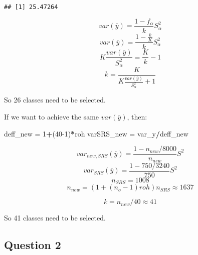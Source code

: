 \documentclass[]{article}
\newenvironment{Shaded}{\begin{snugshade}}{\end{snugshade}}
\newcommand{\DecValTok}[1]{\textcolor[rgb]{0.00,0.00,0.81}{#1}}
\newcommand{\FloatTok}[1]{\textcolor[rgb]{0.00,0.00,0.81}{#1}}
\newcommand{\KeywordTok}[1]{\textcolor[rgb]{0.13,0.29,0.53}{\textbf{#1}}}
\newcommand{\NormalTok}[1]{#1}
\newcommand{\OperatorTok}[1]{\textcolor[rgb]{0.81,0.36,0.00}{\textbf{#1}}}
\newcommand{\StringTok}[1]{\textcolor[rgb]{0.31,0.60,0.02}{#1}}
\begin{document}
\begin{verbatim}
## [1] 25.47264
\end{verbatim}

\[var(\bar y) = \frac{1-f_{\alpha}}{k}S_{\alpha}^2\]
\[var(\bar y) = \frac{1-\frac{k}{K}}{k}S_{\alpha}^2\]
\[K\frac{var(\bar y)}{S_{\alpha}^2}=\frac{K}{k}-1\]
\[k = \frac{K}{K\frac{var(\bar y)}{S_{\alpha}^2}+1}\]

So 26 classes need to be selected.

If we want to achieve the same \(var(\bar y)\), then:

\begin{Shaded}
\begin{Highlighting}[]
\NormalTok{deff_new =}\StringTok{ }\DecValTok{1}\OperatorTok{+}\NormalTok{(}\DecValTok{40-1}\NormalTok{)}\OperatorTok{*}\NormalTok{roh}
\NormalTok{varSRS_new =}\StringTok{ }\NormalTok{var_y}\OperatorTok{/}\NormalTok{deff_new}
\end{Highlighting}
\end{Shaded}

\[var_{new,SRS}(\bar y) = \frac{1-n_{new}/8000}{n_{new}}S^2\]
\[var_{SRS}(\bar y) = \frac{1-750/3240}{750}S^2\] \[n_{SRS} = 1008\]
\[n_{new} = (1+(n_o-1)roh)n_{SRS} \approx 1637\]

\[k = n_{new}/40 \approx 41\]

So 41 classes need to be selected.

\hypertarget{question-2}{%
\subsection{Question 2}\label{question-2}}

\begin{Shaded}
\end{Shaded}
\end{document}
